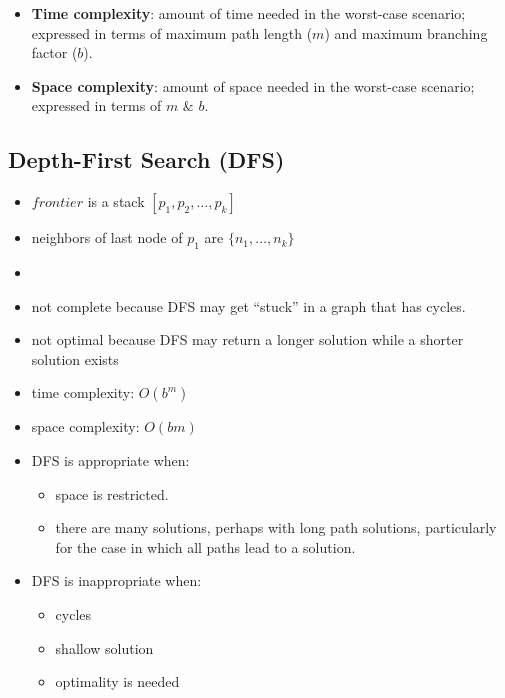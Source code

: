 \documentclass{article}
\begin{document}
\begin{itemize}
    \item \textbf{Time complexity}: amount of time needed in the worst-case scenario; expressed in terms of maximum path length ($m$) and maximum branching factor ($b$).
    \item \textbf{Space complexity}: amount of space needed in the worst-case scenario; expressed in terms of $m$ \& $b$.
\end{itemize}

\subsection{Depth-First Search (DFS)}

\begin{itemize}
    \item $frontier$ is a stack $[p_1, p_2, \ldots, p_k]$
    \item neighbors of last node of $p_1$ are $\{n_1, \ldots, n_k\}$
    \item
    \begin{algorithmic}
            \EndIf
        \EndWhile
    \end{algorithmic}
    \item not complete because DFS may get ``stuck'' in a graph that has cycles.
    \item not optimal because DFS may return a longer solution while a shorter solution exists
    \item time complexity: $O(b^m)$
    \item space complexity: $O(bm)$
    \item DFS is appropriate when:
        \begin{itemize}
            \item space is restricted.
            \item there are many solutions, perhaps with long path solutions, particularly for the case in which all paths lead to a solution.
        \end{itemize}
    \item DFS is inappropriate when:
        \begin{itemize}
            \item cycles
            \item shallow solution
            \item optimality is needed
        \end{itemize}
\end{itemize}
\end{document}
